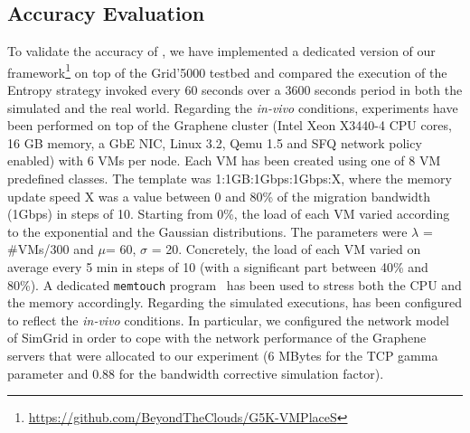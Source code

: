 \subsection{Accuracy Evaluation}
\label{subsec:accuracy}

To validate the accuracy of \vmps, we have implemented a dedicated
version of our
framework\footnote{\url{https://github.com/BeyondTheClouds/G5K-VMPlaceS}}
on top of the Grid'5000 testbed and compared the execution of the
Entropy strategy invoked every 60 seconds over a 3600 seconds period
in both the simulated and the real world.  Regarding the
\textit{in-vivo} conditions, experiments have been performed on top of
the Graphene cluster (Intel Xeon X3440-4 CPU cores, 16 GB memory, a
GbE NIC, Linux 3.2, Qemu 1.5 and SFQ network policy enabled) with 6
VMs per node.  Each VM has been created using one of 8 VM predefined
classes. The template was 1:1GB:1Gbps:1Gbps:X, where the memory update
speed X was a value between 0 and 80\% of the migration bandwidth
(1Gbps) in steps of 10. Starting from 0\%, the load of each VM varied
according to the exponential and the Gaussian distributions. The
parameters were $\lambda$ = \#VMs/300 and $\mu$= 60, $\sigma$ = 20.
Concretely, the load of each VM varied on average every 5 min in steps
of 10 (with a significant part between 40\% and 80\%). A dedicated
\texttt{memtouch} program~\cite{Hirofuchi:2013:ALM:2568486.2568524}
has been used to stress both the CPU and the memory
accordingly. Regarding the simulated executions, \vmps has been
configured to reflect the \textit{in-vivo} conditions. In particular,
we configured the network model of SimGrid in order to cope with the
network performance of the Graphene servers that were allocated to our
experiment (6 MBytes for the TCP gamma parameter and 0.88 for the
bandwidth corrective simulation factor).

